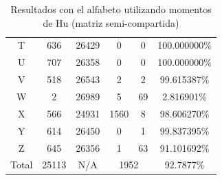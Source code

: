 \documentclass[a4paper, 11pt, oneside]{report}
\begin{document}
\begin{table}
\begin{tabular}{|c|c|c|c|c|c|}
	T & 636 & 26429 & 0 & 0 & 100.000000\% \\ 
	U & 707 & 26358 & 0 & 0 & 100.000000\% \\ 
	V & 518 & 26543 & 2 & 2 & 99.615387\% \\ 
	W & 2 & 26989 & 5 & 69 & 2.816901\% \\ 
	X & 566 & 24931 & 1560 & 8 & 98.606270\% \\ 
	Y & 614 & 26450 & 0 & 1 & 99.837395\% \\ 
	Z & 645 & 26356 & 1 & 63 & 91.101692\% \\ 
	\hline
	Total & 25113 & N/A & \multicolumn{2}{|c|}{1952} & 92.7877\% \\
	\hline
\end{tabular}
\caption{Resultados con el alfabeto utilizando momentos de Hu (matriz semi-compartida)}
\label{tb:alphaHuShared}
\end{table}
\end{document}
